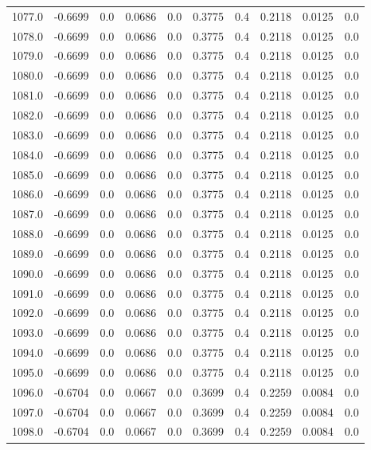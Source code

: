 \begin{longtable}{lrrrrrrrrr}
1077.0 & -0.6699 & 0.0 & 0.0686 & 0.0 & 0.3775 & 0.4 & 0.2118 & 0.0125 & 0.0 \\
1078.0 & -0.6699 & 0.0 & 0.0686 & 0.0 & 0.3775 & 0.4 & 0.2118 & 0.0125 & 0.0 \\
1079.0 & -0.6699 & 0.0 & 0.0686 & 0.0 & 0.3775 & 0.4 & 0.2118 & 0.0125 & 0.0 \\
1080.0 & -0.6699 & 0.0 & 0.0686 & 0.0 & 0.3775 & 0.4 & 0.2118 & 0.0125 & 0.0 \\
1081.0 & -0.6699 & 0.0 & 0.0686 & 0.0 & 0.3775 & 0.4 & 0.2118 & 0.0125 & 0.0 \\
1082.0 & -0.6699 & 0.0 & 0.0686 & 0.0 & 0.3775 & 0.4 & 0.2118 & 0.0125 & 0.0 \\
1083.0 & -0.6699 & 0.0 & 0.0686 & 0.0 & 0.3775 & 0.4 & 0.2118 & 0.0125 & 0.0 \\
1084.0 & -0.6699 & 0.0 & 0.0686 & 0.0 & 0.3775 & 0.4 & 0.2118 & 0.0125 & 0.0 \\
1085.0 & -0.6699 & 0.0 & 0.0686 & 0.0 & 0.3775 & 0.4 & 0.2118 & 0.0125 & 0.0 \\
1086.0 & -0.6699 & 0.0 & 0.0686 & 0.0 & 0.3775 & 0.4 & 0.2118 & 0.0125 & 0.0 \\
1087.0 & -0.6699 & 0.0 & 0.0686 & 0.0 & 0.3775 & 0.4 & 0.2118 & 0.0125 & 0.0 \\
1088.0 & -0.6699 & 0.0 & 0.0686 & 0.0 & 0.3775 & 0.4 & 0.2118 & 0.0125 & 0.0 \\
1089.0 & -0.6699 & 0.0 & 0.0686 & 0.0 & 0.3775 & 0.4 & 0.2118 & 0.0125 & 0.0 \\
1090.0 & -0.6699 & 0.0 & 0.0686 & 0.0 & 0.3775 & 0.4 & 0.2118 & 0.0125 & 0.0 \\
1091.0 & -0.6699 & 0.0 & 0.0686 & 0.0 & 0.3775 & 0.4 & 0.2118 & 0.0125 & 0.0 \\
1092.0 & -0.6699 & 0.0 & 0.0686 & 0.0 & 0.3775 & 0.4 & 0.2118 & 0.0125 & 0.0 \\
1093.0 & -0.6699 & 0.0 & 0.0686 & 0.0 & 0.3775 & 0.4 & 0.2118 & 0.0125 & 0.0 \\
1094.0 & -0.6699 & 0.0 & 0.0686 & 0.0 & 0.3775 & 0.4 & 0.2118 & 0.0125 & 0.0 \\
1095.0 & -0.6699 & 0.0 & 0.0686 & 0.0 & 0.3775 & 0.4 & 0.2118 & 0.0125 & 0.0 \\
1096.0 & -0.6704 & 0.0 & 0.0667 & 0.0 & 0.3699 & 0.4 & 0.2259 & 0.0084 & 0.0 \\
1097.0 & -0.6704 & 0.0 & 0.0667 & 0.0 & 0.3699 & 0.4 & 0.2259 & 0.0084 & 0.0 \\
1098.0 & -0.6704 & 0.0 & 0.0667 & 0.0 & 0.3699 & 0.4 & 0.2259 & 0.0084 & 0.0 \\

\end{longtable}
